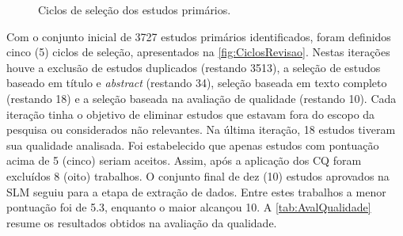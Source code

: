 
\begin{figure}[!htb]
	\centering
	    \caption{Ciclos de seleção dos estudos primários.}
        
	\label{fig:CiclosRevisao}
\end{figure}

Com o conjunto inicial de 3727 estudos primários identificados, 
foram definidos cinco (5) ciclos de seleção, apresentados na \autoref{fig:CiclosRevisao}. 
Nestas iterações houve a exclusão de estudos duplicados (restando 3513), a seleção de estudos baseado em título e \textit{abstract} (restando 34), seleção baseada em texto completo (restando 18) e a seleção baseada na avaliação de qualidade (restando 10). 
Cada iteração tinha o objetivo de eliminar estudos que estavam fora do escopo da pesquisa ou considerados não relevantes. 
Na última iteração, 18 estudos tiveram sua qualidade analisada. 
Foi estabelecido que apenas estudos com pontuação acima de 5 (cinco) seriam aceitos. 
Assim, após a aplicação dos \ac{CQ} foram excluídos 8 (oito) trabalhos. 
O conjunto final de dez (10) estudos aprovados na \ac{SLM} seguiu para a etapa de extração de dados. 
Entre estes trabalhos a menor pontuação foi de 5.3, enquanto o maior alcançou 10. 
A \autoref{tab:AvalQualidade} resume os resultados obtidos na avaliação da qualidade. 

